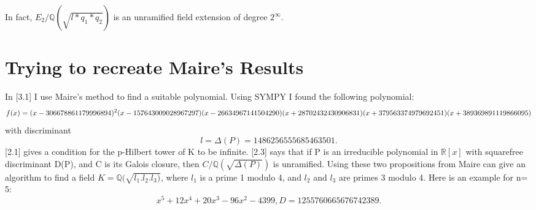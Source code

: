 \documentclass[preprint,12pt,leqno]{elsarticle}
\begin{document}
\begin{center}
\end{center}
\newline
In fact, $E_2/\mathbb{Q}(\sqrt{l*q_1*q_2})$ is an unramified field extension of degree $2^{\infty}$.

\section{Trying to recreate Maire's Results}
In \cite{MAIR}[3.1] I use Maire's method to find a suitable polynomial. 
Using SYMPY I found the following polynomial:
\begin{equation*}
      f(x)=(x - 306678861179996894)^{2}\\(x - 157643009028967297)\\
(x - 26634967141504290)\\(x + 28702432430906831)\\(x + 379563374979692451)\\(x +389369891119866095)
\end{equation*}
\newline
with discriminant
\begin{equation}
    l = \Delta(P) = 1486256555685463501.
\end{equation}
\cite{MAIR}[2.1] gives a condition for the p-Hilbert tower of K to be infinite. 
\newline
\cite{MAIR}[2.3] says that if P is an irreducible polynomial in $\mathbb{R}[x]$ with squarefree discriminant D(P), and C is its Galois closure, then $C/\mathbb{Q}(\sqrt{\Delta(P)})$ is unramified.
\newline
Using these two propositions from Maire can give an algorithm to find a field $K=\mathbb{Q}(\sqrt{l_1.l_2.l_3)}$, where $l_1$ is a prime 1 modulo 4, and $l_2$ and $l_3$ are primes 3 modulo 4. 
\newline
Here is an example for n= 5:
\begin{equation}
    x^5 + 12x^4 + 20x^3 - 96x^2 - 4399, D=1255760665676742389.
\end{equation}
\end{document}
